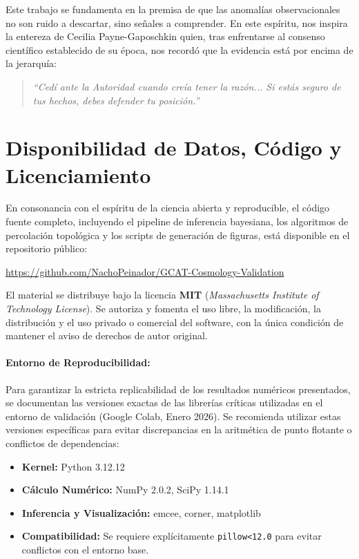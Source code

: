 \documentclass[12pt, a4paper]{article}
\theoremstyle{plain}
\theoremstyle{definition}
\begin{document}
Este trabajo se fundamenta en la premisa de que las anomalías observacionales no son ruido a descartar, sino señales a comprender. En este espíritu, nos inspira la entereza de Cecilia Payne-Gaposchkin quien, tras enfrentarse al consenso científico establecido de su época, nos recordó que la evidencia está por encima de la jerarquía:

\begin{quote}
\textit{``Cedí ante la Autoridad cuando creía tener la razón... Si estás seguro de tus hechos, debes defender tu posición.''}
\end{quote}

\section*{Disponibilidad de Datos, Código y Licenciamiento}

En consonancia con el espíritu de la ciencia abierta y reproducible, el código fuente completo, incluyendo el pipeline de inferencia bayesiana, los algoritmos de percolación topológica y los scripts de generación de figuras, está disponible en el repositorio público:

\begin{center}
\url{https://github.com/NachoPeinador/GCAT-Cosmology-Validation}
\end{center}

El material se distribuye bajo la licencia \textbf{MIT} (\textit{Massachusetts Institute of Technology License}). Se autoriza y fomenta el uso libre, la modificación, la distribución y el uso privado o comercial del software, con la única condición de mantener el aviso de derechos de autor original.

\paragraph{Entorno de Reproducibilidad:}
Para garantizar la estricta replicabilidad de los resultados numéricos presentados, se documentan las versiones exactas de las librerías críticas utilizadas en el entorno de validación (Google Colab, Enero 2026). Se recomienda utilizar estas versiones específicas para evitar discrepancias en la aritmética de punto flotante o conflictos de dependencias:
\begin{itemize}
    \item \textbf{Kernel:} Python 3.12.12
    \item \textbf{Cálculo Numérico:} NumPy 2.0.2, SciPy 1.14.1
    \item \textbf{Inferencia y Visualización:} emcee, corner, matplotlib
    \item \textbf{Compatibilidad:} Se requiere explícitamente \texttt{pillow<12.0} para evitar conflictos con el entorno base.
\end{itemize}
\end{document}
